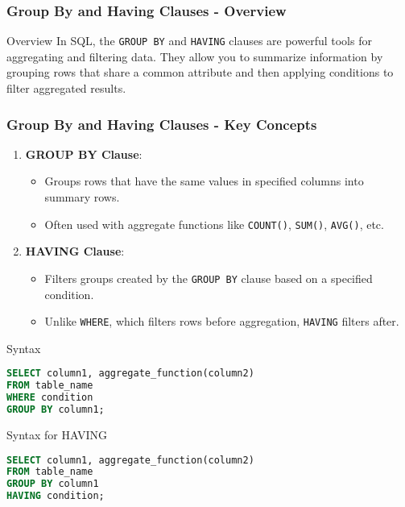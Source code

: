 \documentclass[aspectratio=169]{beamer}
\begin{document}
\begin{frame}[fragile]
    \frametitle{Group By and Having Clauses - Overview}
    \begin{block}{Overview}
        In SQL, the \texttt{GROUP BY} and \texttt{HAVING} clauses are powerful tools for aggregating and filtering data. 
        They allow you to summarize information by grouping rows that share a common attribute 
        and then applying conditions to filter aggregated results.
    \end{block}
\end{frame}

\begin{frame}[fragile]
    \frametitle{Group By and Having Clauses - Key Concepts}
    \begin{enumerate}
        \item \textbf{GROUP BY Clause}:
        \begin{itemize}
            \item Groups rows that have the same values in specified columns into summary rows.
            \item Often used with aggregate functions like \texttt{COUNT()}, \texttt{SUM()}, \texttt{AVG()}, etc.
        \end{itemize}
        
        \item \textbf{HAVING Clause}:
        \begin{itemize}
            \item Filters groups created by the \texttt{GROUP BY} clause based on a specified condition.
            \item Unlike \texttt{WHERE}, which filters rows before aggregation, \texttt{HAVING} filters after.
        \end{itemize}
    \end{enumerate}

    \begin{block}{Syntax}
    \begin{lstlisting}[language=SQL]
SELECT column1, aggregate_function(column2)
FROM table_name
WHERE condition
GROUP BY column1;
    \end{lstlisting}
    \end{block}

    \begin{block}{Syntax for HAVING}
    \begin{lstlisting}[language=SQL]
SELECT column1, aggregate_function(column2)
FROM table_name
GROUP BY column1
HAVING condition;
    \end{lstlisting}
    \end{block}
\end{frame}
\end{document}
